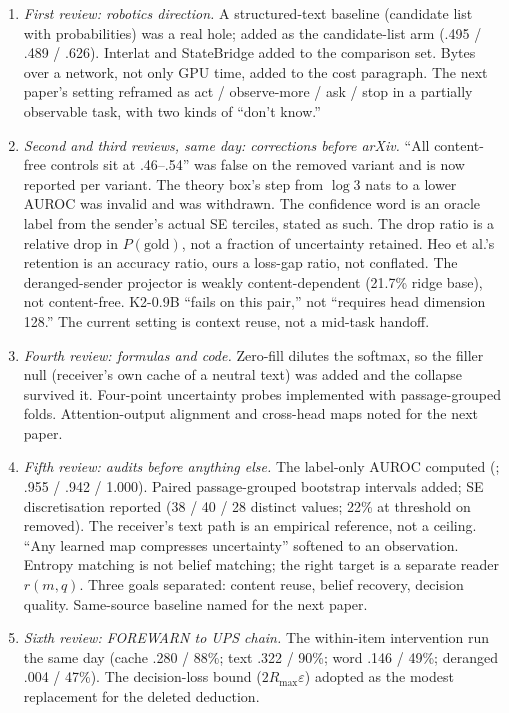 \documentclass[11pt,a4paper]{report}
\begin{document}
\begin{enumerate}[label=,leftmargin=1.2em]
\item \emph{First review: robotics direction.} A structured-text baseline (candidate list with probabilities) was a real hole; added as the candidate-list arm (.495 / .489 / .626). Interlat and StateBridge added to the comparison set. Bytes over a network, not only GPU time, added to the cost paragraph. The next paper's setting reframed as act / observe-more / ask / stop in a partially observable task, with two kinds of ``don't know.''
\item \emph{Second and third reviews, same day: corrections before arXiv.} ``All content-free controls sit at .46--.54'' was false on the removed variant and is now reported per variant. The theory box's step from $\log 3$ nats to a lower AUROC was invalid and was withdrawn. The confidence word is an oracle label from the sender's actual SE terciles, stated as such. The drop ratio is a relative drop in $P(\text{gold})$, not a fraction of uncertainty retained. Heo et al.'s retention is an accuracy ratio, ours a loss-gap ratio, not conflated. The deranged-sender projector is weakly content-dependent (21.7\% ridge base), not content-free. K2-0.9B ``fails on this pair,'' not ``requires head dimension 128.'' The current setting is context reuse, not a mid-task handoff.
\item \emph{Fourth review: formulas and code.} Zero-fill dilutes the softmax, so the filler null (receiver's own cache of a neutral text) was added and the collapse survived it. Four-point uncertainty probes implemented with passage-grouped folds. Attention-output alignment and cross-head maps noted for the next paper.
\item \emph{Fifth review: audits before anything else.} The label-only AUROC computed (; .955 / .942 / 1.000). Paired passage-grouped bootstrap intervals added; SE discretisation reported (38 / 40 / 28 distinct values; 22\% at threshold on removed). The receiver's text path is an empirical reference, not a ceiling. ``Any learned map compresses uncertainty'' softened to an observation. Entropy matching is not belief matching; the right target is a separate reader $r(m, q)$. Three goals separated: content reuse, belief recovery, decision quality. Same-source baseline named for the next paper.
\item \emph{Sixth review: FOREWARN to UPS chain.} The within-item intervention run the same day (cache .280 / 88\%; text .322 / 90\%; word .146 / 49\%; deranged .004 / 47\%). The decision-loss bound ($2 R_{\max} \varepsilon$) adopted as the modest replacement for the deleted deduction.
\end{enumerate}
\end{document}
